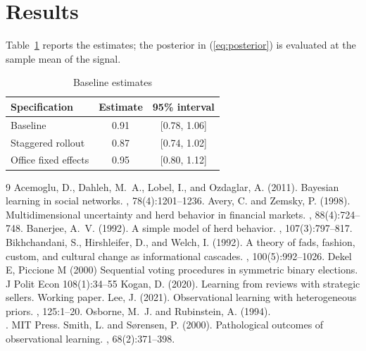 \documentclass[12pt]{article}
\begin{document}
\section{Results}
\setcounter{table}{1}
Table~\ref{tab:main} reports the estimates; the posterior in (\ref{eq:posterior}) is evaluated at the sample mean of the signal.
\begin{table}[h]
\centering
\caption{Baseline estimates}\label{tab:main}
\begin{tabular}{lcc}
\hline
Specification & Estimate & 95\% interval \\
\hline
Baseline & 0.91 & [0.78, 1.06] \\
Staggered rollout & 0.87 & [0.74, 1.02] \\
Office fixed effects & 0.95 & [0.80, 1.12] \\
\hline
\end{tabular}
\end{table}


\begin{thebibliography}{9}
Acemoglu, D., Dahleh, M.~A., Lobel, I., and Ozdaglar, A. (2011).
\newblock Bayesian learning in social networks.
, 78(4):1201--1236.
Avery, C. and Zemsky, P. (1998).
\newblock Multidimensional uncertainty and herd behavior in financial markets.
, 88(4):724--748.
Banerjee, A.~V. (1992).
\newblock A simple model of herd behavior.
, 107(3):797--817.
Bikhchandani, S., Hirshleifer, D., and Welch, I. (1992).
\newblock A theory of fads, fashion, custom, and cultural change as informational cascades.
, 100(5):992--1026.
Dekel E, Piccione M (2000) Sequential voting procedures in symmetric binary elections.\\
J Polit Econ 108(1):34--55
Kogan, D. (2020).
\newblock Learning from reviews with strategic sellers.
\newblock Working paper.
Lee, J. (2021).
\newblock Observational learning with heterogeneous priors.
, 125:1--20.
Osborne, M.~J. and Rubinstein, A. (1994).\\
. MIT Press.
Smith, L. and S{\o}rensen, P. (2000).
\newblock Pathological outcomes of observational learning.
, 68(2):371--398.
\end{thebibliography}
\end{document}

